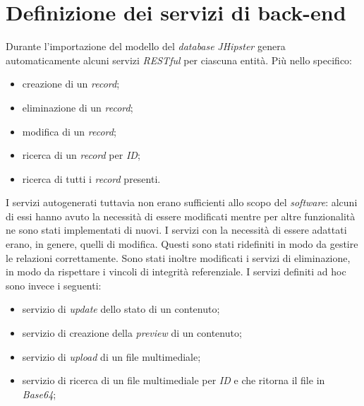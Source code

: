 \section{Definizione dei servizi di back-end}
Durante l'importazione del modello del \textit{database} \textit{JHipster} genera automaticamente alcuni servizi \textit{RESTful} per ciascuna entità. Più nello specifico:
\begin{itemize}
    \item creazione di un \textit{record};
    \item eliminazione di un \textit{record};
    \item modifica di un \textit{record};
    \item ricerca di un \textit{record} per \textit{ID};
    \item ricerca di tutti i \textit{record} presenti.
\end{itemize}
I servizi autogenerati tuttavia non erano sufficienti allo scopo del \textit{software}: alcuni di essi hanno avuto la necessità di essere modificati mentre per altre funzionalità ne sono stati implementati di nuovi. I servizi con la necessità di essere adattati erano, in genere, quelli di modifica. Questi sono stati ridefiniti in modo da gestire le relazioni correttamente. Sono stati inoltre modificati i servizi di eliminazione, in modo da rispettare i vincoli di integrità referenziale.
I servizi definiti ad hoc sono invece i seguenti:
\begin{itemize}
    \item servizio di \textit{update} dello stato di un contenuto;
    \item servizio di creazione della \textit{preview} di un contenuto;
    \item servizio di \textit{upload} di un file multimediale;
    \item servizio di ricerca di un file multimediale per \textit{ID} e che ritorna il file in \textit{Base64};
\end{itemize}
